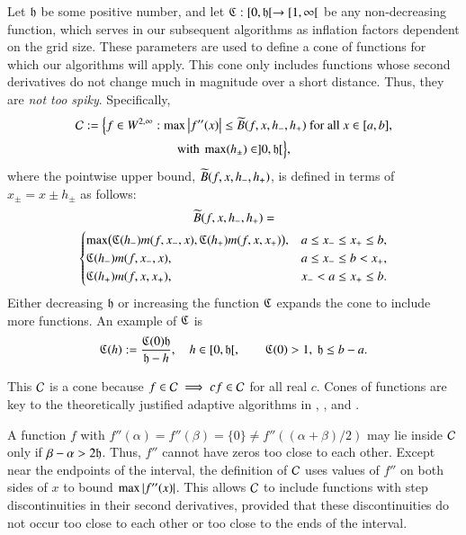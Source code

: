 \documentclass[review]{elsarticle}
\makeatletter
\newcommand{\Vast}{\bBigg@{6}}
\theoremstyle{definition}
\newcommand{\Vastr}{\mathclose\Vast}
\renewcommand{\cw}{W}
\makeatother
\begin{document}
Let $\mathfrak{h}$ be some positive number, and let $\mathfrak{C} : [0,\mathfrak{h}[ \to [1,\infty[$ be any
non-decreasing function, which serves in our subsequent algorithms as inflation factors dependent on the grid size.
These parameters are used to define a cone of functions for which our algorithms will
apply.  This cone only includes functions whose second derivatives do not change much in
magnitude over a short distance.  Thus, they are \emph{not too spiky}.  Specifically,
\begin{multline} \label{conedef}
 \cc :=   \Bigl \{
 f  \in    \cw^{2,\infty}:   \max\abs{f''(x)}  \le \tB(f,x,h_-,h_+)  \text{ for all } x \in [a,b],
\\ \text{with }  \max(h_{\pm}) \in ]0, \fh[  \Bigr \},
\end{multline}
where the pointwise upper bound, $\widetilde{B}(f,x,h_-,h_+)$, is defined in terms of $x_{\pm} =x \pm h_{\pm}$ as follows:
\begin{multline*}
\tB(f,x,h_-,h_+)=\\
\begin{cases}
  \max\bigl(\fC(h_{-}) m(f,x_-,x),\fC(h_{+}) m(f,x,x_+)\bigr), & a \le x_- \le x_+ \le b,\\
\fC(h_{-}) m(f,x_-,x), & a \le x_- \le b <  x_+,\\
\fC(h_{+}) m(f,x,x_+), & x_- < a \le x_+ \le b.
\end{cases} %
\end{multline*}
Either decreasing $\mathfrak{h}$ or increasing the function $\mathfrak{C}$ expands the cone to include more functions.  An example of $\mathfrak{C}$ is
\begin{equation} \label{sampleC}
\mathfrak{C}(h) : = \frac{\mathfrak{C}(0) \mathfrak{h}}{\mathfrak{h} - h}, \quad h \in [0,\mathfrak{h}[, \qquad \mathfrak{C}(0) > 1,\ \mathfrak{h} \le b - a.
\end{equation}

This $\mathcal{C}$ is a cone because $f \in \mathcal{C} \implies cf \in \mathcal{C}$ for all real
$c$. Cones of
functions are key to the theoretically justified adaptive algorithms in
\cite{HicEtal14b}, \cite{Ton14a}, and \cite{Din15a}.

A function $f$ with $f''(\alpha) = f''(\beta) = \{0\} \ne f''((\alpha+\beta)/2)$ may
lie inside $\mathcal{C}$ only if $\beta - \alpha > 2\mathfrak{h}$. Thus, $f''$ cannot have zeros too close to each other.  Except near the endpoints of
the interval, the definition of $\mathcal{C}$ uses values of $f''$ on both sides of $x$
to bound $\max \left \lvert f''(x) \right \rvert$. This allows $\mathcal{C}$ to include functions with step
discontinuities in their second derivatives, provided that these discontinuities
do not occur too close to each other or too close to the ends of the interval.
\end{document}
